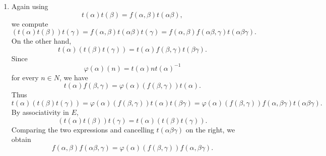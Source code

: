 \documentclass[../Odyssey_Project.tex]{subfiles}
\begin{document}
\begin{solution}
\begin{enumerate}
        \item[3] Again using
        \[
            t(\alpha)t(\beta) = f(\alpha,\beta)t(\alpha\beta),
        \]
        we compute
        \[
            (t(\alpha)t(\beta))t(\gamma)
            =
            f(\alpha,\beta)t(\alpha\beta)t(\gamma)
            =
            f(\alpha,\beta)f(\alpha\beta,\gamma)t(\alpha\beta\gamma).
        \]
        On the other hand,
        \[
            t(\alpha)(t(\beta)t(\gamma))
            =
            t(\alpha)f(\beta,\gamma)t(\beta\gamma).
        \]
        Since
        \[
            \varphi(\alpha)(n) = t(\alpha)nt(\alpha)^{-1}
        \]
        for every $n \in N$, we have
        \[
            t(\alpha)f(\beta,\gamma)
            =
            \varphi(\alpha)(f(\beta,\gamma))t(\alpha).
        \]
        Thus
        \[
            t(\alpha)(t(\beta)t(\gamma))
            =
            \varphi(\alpha)(f(\beta,\gamma))t(\alpha)t(\beta\gamma)
            =
            \varphi(\alpha)(f(\beta,\gamma))f(\alpha,\beta\gamma)t(\alpha\beta\gamma).
        \]
        By associativity in $E$,
        \[
            (t(\alpha)t(\beta))t(\gamma)
            =
            t(\alpha)(t(\beta)t(\gamma)).
        \]
        Comparing the two expressions and cancelling $t(\alpha\beta\gamma)$ on the right, we obtain
        \[
            f(\alpha,\beta)f(\alpha\beta,\gamma)
            =
            \varphi(\alpha)(f(\beta,\gamma))f(\alpha,\beta\gamma).
        \]
    \end{enumerate}
\end{solution}
\end{document}
